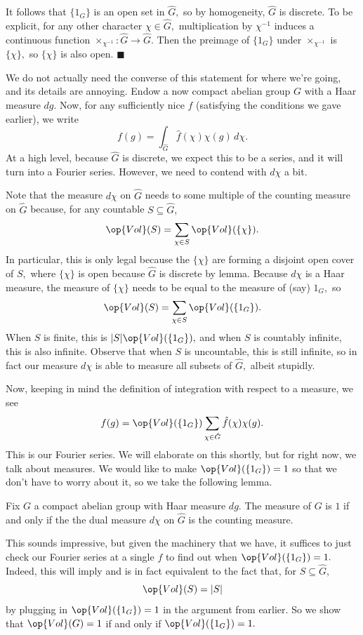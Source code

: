 It follows that $\{1_G\}$ is an open set in $\hat G,$ so by homogeneity, $\hat G$ is discrete. To be explicit, for any other character $\chi\in\hat G,$ multiplication by $\chi^{-1}$ induces a continuous function $\times_{\chi^{-1}}:\hat G\to\hat G.$ Then the preimage of $\{1_G\}$ under $\times_{\chi^{-1}}$ is $\{\chi\},$ so $\{\chi\}$ is also open. $\blacksquare$

We do not actually need the converse of this statement for where we're going, and its details are annoying. Endow a now compact abelian group $G$ with a Haar measure $dg.$ Now, for any sufficiently nice $f$ (satisfying the conditions we gave earlier), we write
\[f(g)=\int_{\hat G}\hat f(\chi)\chi(g)\,d\chi.\]
At a high level, because $\hat G$ is discrete, we expect this to be a series, and it will turn into a Fourier series. However, we need to contend with $d\chi$ a bit.

Note that the measure $d\chi$ on $\hat G$ needs to some multiple of the counting measure on $\hat G$ because, for any countable $S\subseteq\hat G,$
\[\op{Vol}(S)=\sum_{\chi\in S}\op{Vol}(\{\chi\}).\]
In particular, this is only legal because the $\{\chi\}$ are forming a disjoint open cover of $S,$ where $\{\chi\}$ is open because $\hat G$ is discrete by lemma. Because $d\chi$ is a Haar measure, the measure of $\{\chi\}$ needs to be equal to the measure of (say) $1_G,$ so
\[\op{Vol}(S)=\sum_{\chi\in S}\op{Vol}(\{1_G\}).\]
When $S$ is finite, this is $|S|\op{Vol}(\{1_G\}),$ and when $S$ is countably infinite, this is also infinite. Observe that when $S$ is uncountable, this is still infinite, so in fact our measure $d\chi$ is able to measure all subsets of $\hat G,$ albeit stupidly.

Now, keeping in mind the definition of integration with respect to a measure, we see
\[f(g)=\op{Vol}(\{1_G\})\sum_{\chi\in\hat G}\hat f(\chi)\chi(g).\]
This is our Fourier series. We will elaborate on this shortly, but for right now, we talk about measures. We would like to make $\op{Vol}(\{1_G\})=1$ so that we don't have to worry about it, so we take the following lemma.
\begin{lemma}
    Fix $G$ a compact abelian group with Haar measure $dg.$ The measure of $G$ is $1$ if and only if the the dual measure $d\chi$ on $\hat G$ is the counting measure.
\end{lemma}
This sounds impressive, but given the machinery that we have, it suffices to just check our Fourier series at a single $f$ to find out when $\op{Vol}(\{1_G\})=1.$ Indeed, this will imply and is in fact equivalent to the fact that, for $S\subseteq\hat G,$
\[\op{Vol}(S)=|S|\]
by plugging in $\op{Vol}(\{1_G\})=1$ in the argument from earlier. So we show that $\op{Vol}(G)=1$ if and only if $\op{Vol}(\{1_G\})=1.$

